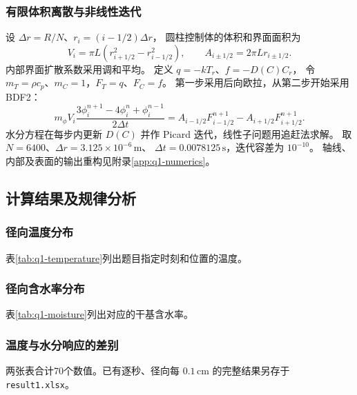 \subsubsection{有限体积离散与非线性迭代}
设 $\Delta r=R/N$、$r_i=(i-1/2)\Delta r$，
圆柱控制体的体积和界面面积为
\begin{equation}
V_i=\pi L(r_{i+1/2}^2-r_{i-1/2}^2),\qquad
A_{i\pm1/2}=2\pi Lr_{i\pm1/2}.
\label{eq:q1-cell-geometry}
\end{equation}
内部界面扩散系数采用调和平均。
定义 $q=-kT_r$、$f=-D(C)C_r$，
令 $m_T=\rho c_p$、$m_C=1$，$F_T=q$、$F_C=f$。
第一步采用后向欧拉，从第二步开始采用 BDF2：
\begin{equation}
m_\phi V_i\frac{3\phi_i^{n+1}-4\phi_i^n+\phi_i^{n-1}}{2\Delta t}
=A_{i-1/2}F_{i-1/2}^{n+1}-A_{i+1/2}F_{i+1/2}^{n+1}.
\label{eq:q1-bdf2}
\end{equation}
水分方程在每步内更新 $D(C)$ 并作 Picard 迭代，线性子问题用追赶法求解。
取 $N=6400$、$\Delta r=3.125\times10^{-6}\,\mathrm{m}$、
$\Delta t=0.0078125\,\mathrm{s}$，迭代容差为 $10^{-10}$。
轴线、内部及表面的输出重构见附录\ref{app:q1-numerics}。

\subsection{计算结果及规律分析}
\subsubsection{径向温度分布}
表\ref{tab:q1-temperature}列出题目指定时刻和位置的温度。


\subsubsection{径向含水率分布}
表\ref{tab:q1-moisture}列出对应的干基含水率。


\subsubsection{温度与水分响应的差别}
两张表合计70个数值。已有逐秒、径向每 $0.1\,\mathrm{cm}$
的完整结果另存于 \texttt{result1.xlsx}。

